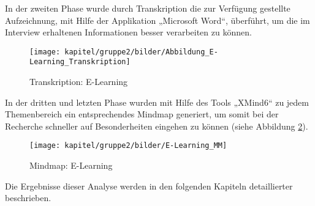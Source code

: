 In der zweiten Phase wurde durch Transkription die zur Verfügung gestellte Aufzeichnung, mit Hilfe der Applikation „Microsoft Word“, überführt, um die im Interview erhaltenen Informationen besser verarbeiten zu können.

\begin{figure}[h!]
	\centering
	\texttt{[image: kapitel/gruppe2/bilder/Abbildung\_E-Learning\_Transkription]}
	\caption{Transkription: E-Learning}
	\label{fig_E-Learning_Transkription}
\end{figure}

In der dritten und letzten Phase wurden mit Hilfe des Tools „XMind6“ zu jedem Themenbereich ein entsprechendes Mindmap generiert, um somit bei der Recherche schneller auf Besonderheiten eingehen zu können  (siehe Abbildung \ref{fig_E-Learning_MM}).

\begin{figure}[h!]
	\centering
	\texttt{[image: kapitel/gruppe2/bilder/E-Learning\_MM]}
	\caption{Mindmap: E-Learning}
	\label{fig_E-Learning_MM}
\end{figure}

Die Ergebnisse dieser Analyse werden in den folgenden Kapiteln detaillierter beschrieben. 
